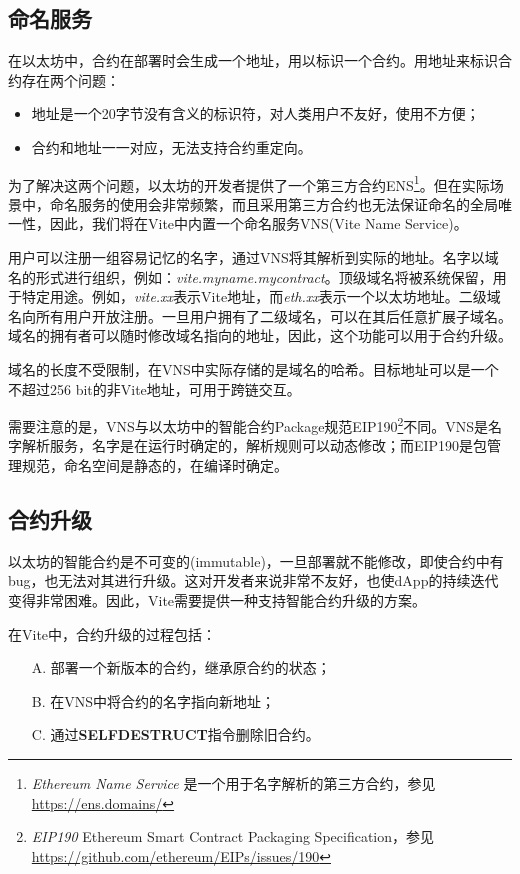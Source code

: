 \documentclass[UTF8,nofonts]{ctexart}
\begin{document}
\begin{multicols}{2}
\subsection{命名服务}\label{sec:vns}
在以太坊中，合约在部署时会生成一个地址，用以标识一个合约。用地址来标识合约存在两个问题：
\begin{itemize}
	\item 地址是一个20字节没有含义的标识符，对人类用户不友好，使用不方便；
	\item 合约和地址一一对应，无法支持合约重定向。
\end{itemize}

为了解决这两个问题，以太坊的开发者提供了一个第三方合约ENS\footnote{\textit{Ethereum Name Service} 是一个用于名字解析的第三方合约，参见 \url{https://ens.domains/}}。但在实际场景中，命名服务的使用会非常频繁，而且采用第三方合约也无法保证命名的全局唯一性，因此，我们将在Vite中内置一个命名服务VNS(Vite Name Service)。

用户可以注册一组容易记忆的名字，通过VNS将其解析到实际的地址。名字以域名的形式进行组织，例如：\textit{vite.myname.mycontract}。顶级域名将被系统保留，用于特定用途。例如，\textit{vite.xx}表示Vite地址，而\textit{eth.xx}表示一个以太坊地址。二级域名向所有用户开放注册。一旦用户拥有了二级域名，可以在其后任意扩展子域名。域名的拥有者可以随时修改域名指向的地址，因此，这个功能可以用于合约升级。

域名的长度不受限制，在VNS中实际存储的是域名的哈希。目标地址可以是一个不超过256 bit的非Vite地址，可用于跨链交互。

需要注意的是，VNS与以太坊中的智能合约Package规范EIP190\footnote{\textit{EIP190} Ethereum Smart Contract Packaging Specification，参见 \url{https://github.com/ethereum/EIPs/issues/190}}不同。VNS是名字解析服务，名字是在运行时确定的，解析规则可以动态修改；而EIP190是包管理规范，命名空间是静态的，在编译时确定。

\subsection{合约升级}
以太坊的智能合约是不可变的(immutable)，一旦部署就不能修改，即使合约中有bug，也无法对其进行升级。这对开发者来说非常不友好，也使dApp的持续迭代变得非常困难。因此，Vite需要提供一种支持智能合约升级的方案。

在Vite中，合约升级的过程包括：
\begin{itemize}
	\item[A.] 部署一个新版本的合约，继承原合约的状态；
	\item[B.] 在VNS中将合约的名字指向新地址；
	\item[C.] 通过\textbf{SELFDESTRUCT}指令删除旧合约。
\end{itemize}


\end{multicols}
\end{document}
